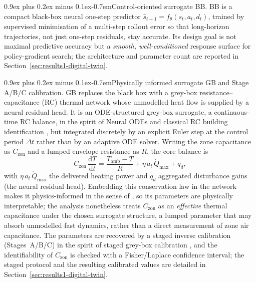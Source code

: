 \documentclass[a4paper,fleqn]{cas-sc}
\makeatletter
\renewcommand\paragraph{\@startsection{paragraph}{4}{\z@}%
 {0.9ex plus 0.2ex minus 0.1ex}{-0.7em}{\normalfont\normalsize\bfseries}}
\newcommand{\Czon}{\ensuremath{C_{\mathrm{zon}}}}
\makeatother
\begin{document}
\paragraph{Control-oriented surrogate BB.}
BB is a compact black-box neural one-step predictor
$\hat{s}_{t+1}=f_\theta(s_t,a_t,d_t)$, trained by supervised minimisation of a
multi-step rollout error so that long-horizon trajectories, not just one-step
residuals, stay accurate. Its design goal is not maximal predictive accuracy but
a \emph{smooth, well-conditioned} response surface for policy-gradient search; the
architecture and parameter count are reported in Section~\ref{sec:results1-digital-twin}.

\paragraph{Physically informed surrogate GB and Stage A/B/C calibration.}
GB replaces the black box with a grey-box resistance--capacitance (RC) thermal
network whose unmodelled heat flow is supplied by a neural residual head. It is an
ODE-structured grey-box surrogate, a continuous-time RC balance, in the spirit
of Neural ODEs \citep{Chen2018NeuralODE} and classical RC building identification
\citep{Bunning2020RC,Berthou2014RC,Bacher2011RCIdentification,Picard2017WhiteBox},
but integrated discretely by an explicit Euler step at the control period
$\Delta t$ rather than by an adaptive ODE solver. Writing the zone capacitance as
$\Czon$ and a lumped envelope resistance as $R$, the core balance is
\begin{equation*}
\Czon\,\frac{\mathrm{d}T}{\mathrm{d}t}
= \frac{T_{\mathrm{amb}}-T}{R} + \eta\,a_t\,\dot{Q}_{\max} + q_d,
\end{equation*}
with $\eta\,a_t\,\dot{Q}_{\max}$ the delivered heating power and $q_d$ aggregated
disturbance gains (the neural residual head). Embedding this conservation law in the
network makes it physics-informed in the sense of
\citet{Raissi2019PINN,Karpatne2017TheoryGuided,Willard2022PIML}, so its parameters
are physically interpretable; the analysis nonetheless treats $\Czon$ as an \emph{effective}
thermal capacitance under the chosen surrogate structure, a lumped parameter
that may absorb unmodelled fast dynamics, rather than a direct measurement of
zone air capacitance. The parameters are recovered by a staged inverse calibration
(Stages~A/B/C) in the spirit of staged grey-box calibration
\citep{Bacher2011RCIdentification}, and the identifiability of $\Czon$ is checked
with a Fisher/Laplace confidence interval; the staged protocol and the resulting
calibrated values are detailed in Section~\ref{sec:results1-digital-twin}.
\end{document}
